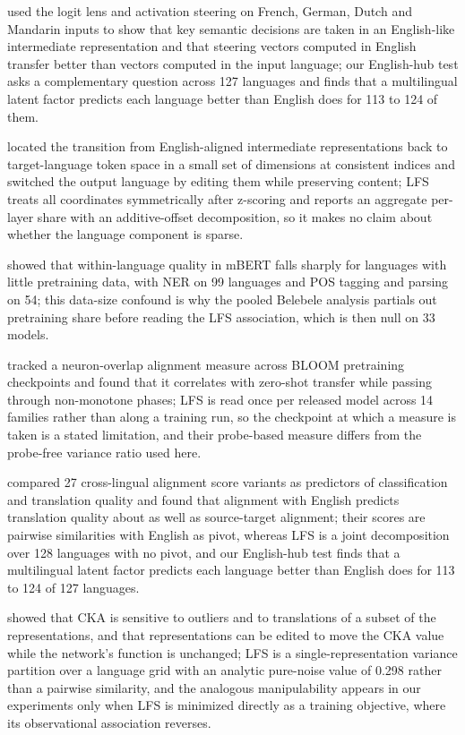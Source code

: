 \documentclass[11pt,a4paper]{article}
\begin{document}
\citet{schut2025english} used the logit lens and activation steering on French, German, Dutch and Mandarin inputs to show that key semantic decisions are taken in an English-like intermediate representation and that steering vectors computed in English transfer better than vectors computed in the input language; our English-hub test asks a complementary question across 127 languages and finds that a multilingual latent factor predicts each language better than English does for 113 to 124 of them.

\citet{zhong2026sparse} located the transition from English-aligned intermediate representations back to target-language token space in a small set of dimensions at consistent indices and switched the output language by editing them while preserving content; LFS treats all coordinates symmetrically after z-scoring and reports an aggregate per-layer share with an additive-offset decomposition, so it makes no claim about whether the language component is sparse.

\citet{wu2020equal} showed that within-language quality in mBERT falls sharply for languages with little pretraining data, with NER on 99 languages and POS tagging and parsing on 54; this data-size confound is why the pooled Belebele analysis partials out pretraining share before reading the LFS association, which is then null on 33 models.

\citet{wang2024emergence} tracked a neuron-overlap alignment measure across BLOOM pretraining checkpoints and found that it correlates with zero-shot transfer while passing through non-monotone phases; LFS is read once per released model across 14 families rather than along a training run, so the checkpoint at which a measure is taken is a stated limitation, and their probe-based measure differs from the probe-free variance ratio used here.

\citet{alali2026english} compared 27 cross-lingual alignment score variants as predictors of classification and translation quality and found that alignment with English predicts translation quality about as well as source-target alignment; their scores are pairwise similarities with English as pivot, whereas LFS is a joint decomposition over 128 languages with no pivot, and our English-hub test finds that a multilingual latent factor predicts each language better than English does for 113 to 124 of 127 languages.

\citet{davari2023cka} showed that CKA is sensitive to outliers and to translations of a subset of the representations, and that representations can be edited to move the CKA value while the network's function is unchanged; LFS is a single-representation variance partition over a language grid with an analytic pure-noise value of 0.298 rather than a pairwise similarity, and the analogous manipulability appears in our experiments only when LFS is minimized directly as a training objective, where its observational association reverses.
\end{document}
